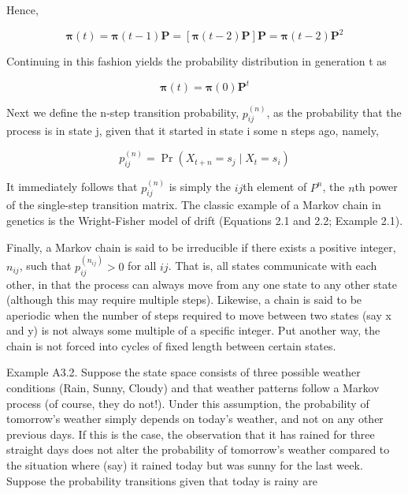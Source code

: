 \documentclass{article}
\begin{document}
Hence,

\begin{equation}
\boldsymbol{\pi}(t)=\boldsymbol{\pi}(t-1)\mathbf{P}=\left[\boldsymbol{\pi}(t-2)\mathbf{P}\right]\mathbf{P}=\boldsymbol{\pi}(t-2)\mathbf{P}^{2}
\end{equation}

Continuing in this fashion yields the probability distribution in generation t as

\begin{equation}
\boldsymbol{\pi}(t)=\boldsymbol{\pi}(0)\mathbf{P}^{t}
\end{equation}

Next we define the n-step transition probability,  $ p_{ij}^{(n)} $, as the probability that the process is in state j, given that it started in state i some n steps ago, namely,

\begin{equation}
p_{ij}^{(n)}=\Pr(X_{t+n}=s_{j}\mid X_{t}=s_{i})
\end{equation}

It immediately follows that  $ p_{ij}^{(n)} $ is simply the  $ ij $th element of  $ P^n $, the  $ n $th power of the single-step transition matrix. The classic example of a Markov chain in genetics is the Wright-Fisher model of drift (Equations 2.1 and 2.2; Example 2.1).

Finally, a Markov chain is said to be irreducible if there exists a positive integer,  $ n_{ij} $, such that  $ p_{ij}^{(n_{ij})} > 0 $ for all  $ ij $. That is, all states communicate with each other, in that the process can always move from any one state to any other state (although this may require multiple steps). Likewise, a chain is said to be aperiodic when the number of steps required to move between two states (say x and y) is not always some multiple of a specific integer. Put another way, the chain is not forced into cycles of fixed length between certain states.

Example A3.2. Suppose the state space consists of three possible weather conditions (Rain, Sunny, Cloudy) and that weather patterns follow a Markov process (of course, they do not!). Under this assumption, the probability of tomorrow's weather simply depends on today's weather, and not on any other previous days. If this is the case, the observation that it has rained for three straight days does not alter the probability of tomorrow's weather compared to the situation where (say) it rained today but was sunny for the last week. Suppose the probability transitions given that today is rainy are
\end{document}
